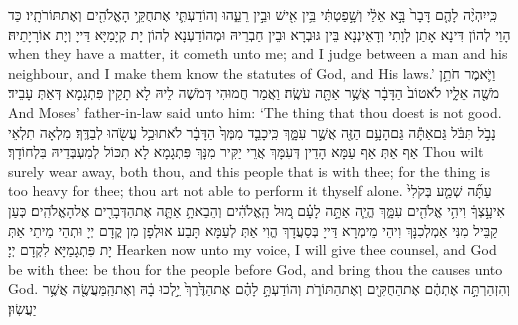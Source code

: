 {כִּֽי\maqqaf יִהְיֶ֨ה לָהֶ֤ם דָּבָר֙ בָּ֣א אֵלַ֔י וְשָׁ֣פַטְתִּ֔י בֵּ֥ין אִ֖ישׁ וּבֵ֣ין רֵעֵ֑הוּ וְהוֹדַעְתִּ֛י אֶת\maqqaf חֻקֵּ֥י הָאֱלֹהִ֖ים וְאֶת\maqqaf תּוֹרֹתָֽיו׃}
{כַּד הָוֵי לְהוֹן דִּינָא אָתַן לְוָתִי וְדָאֵינְנָא בֵּין גּוּבְרָא וּבֵין חַבְרֵיהּ וּמְהוֹדַעְנָא לְהוֹן יָת קְיָמַיָּא דַּייָ וְיָת אוֹרָיָתֵיהּ׃}
{when they have a matter, it cometh unto me; and I judge between a man and his neighbour, and I make them know the statutes of God, and His laws.’}{}
{וַיֹּ֛אמֶר חֹתֵ֥ן מֹשֶׁ֖ה אֵלָ֑יו לֹא\maqqaf טוֹב֙ הַדָּבָ֔ר אֲשֶׁ֥ר אַתָּ֖ה עֹשֶֽׂה׃}
{וַאֲמַר חֲמוּהִי דְּמֹשֶׁה לֵיהּ לָא תָקֵין פִּתְגָמָא דְּאַתְּ עָבֵיד׃}
{And Moses’ father-in-law said unto him: ‘The thing that thou doest is not good.}{}
{נָבֹ֣ל תִּבֹּ֔ל גַּם\maqqaf אַתָּ֕ה גַּם\maqqaf הָעָ֥ם הַזֶּ֖ה אֲשֶׁ֣ר עִמָּ֑ךְ כִּֽי\maqqaf כָבֵ֤ד מִמְּךָ֙ הַדָּבָ֔ר לֹא\maqqaf תוּכַ֥ל עֲשֹׂ֖הוּ לְבַדֶּֽךָ׃}
{מִלְאָה תִלְאֵי אַף אַתְּ אַף עַמָּא הָדֵין דְּעִמָּךְ אֲרֵי יַקִּיר מִנָּךְ פִּתְגָמָא לָא תִכּוֹל לְמִעְבְּדֵיהּ בִּלְחוֹדָךְ׃}
{Thou wilt surely wear away, both thou, and this people that is with thee; for the thing is too heavy for thee; thou art not able to perform it thyself alone.}{}
{עַתָּ֞ה שְׁמַ֤ע בְּקֹלִי֙ אִיעָ֣צְךָ֔ וִיהִ֥י אֱלֹהִ֖ים עִמָּ֑ךְ הֱיֵ֧ה אַתָּ֣ה לָעָ֗ם מ֚וּל הָֽאֱלֹהִ֔ים וְהֵבֵאתָ֥ אַתָּ֛ה אֶת\maqqaf הַדְּבָרִ֖ים אֶל\maqqaf הָאֱלֹהִֽים׃}
{כְּעַן קַבֵּיל מִנִּי אַמְלְכִנָּךְ וִיהֵי מֵימְרָא דַּייָ בְּסַעֲדָךְ הֱוִי אַתְּ לְעַמָּא תָּבַע אוּלְפָן מִן קֳדָם יְיָ וּתְהֵי מֵיתֵי אַתְּ יָת פִּתְגָמַיָּא לִקְדָם יְיָ׃}
{Hearken now unto my voice, I will give thee counsel, and God be with thee: be thou for the people before God, and bring thou the causes unto God.}{}
{וְהִזְהַרְתָּ֣ה אֶתְהֶ֔ם אֶת\maqqaf הַחֻקִּ֖ים וְאֶת\maqqaf הַתּוֹרֹ֑ת וְהוֹדַעְתָּ֣ לָהֶ֗ם אֶת\maqqaf הַדֶּ֙רֶךְ֙ יֵ֣לְכוּ בָ֔הּ וְאֶת\maqqaf הַֽמַּעֲשֶׂ֖ה אֲשֶׁ֥ר יַעֲשֽׂוּן׃}
